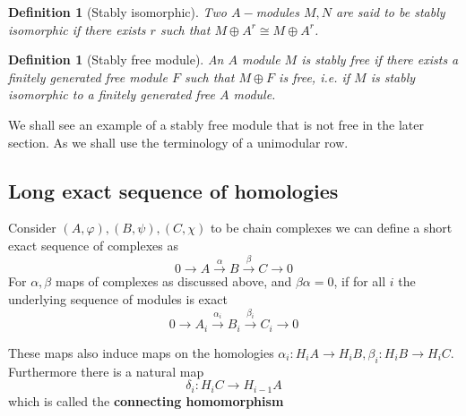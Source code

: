 \documentclass[12pt]{article}
\numberwithin{equation}{section}
\newcounter{dummy} \numberwithin{dummy}{section}
\newtheorem{definition}[dummy]{Definition}
\begin{document}
	\begin{definition}[Stably isomorphic]\label{stabiso}
		Two $A-$modules $M,N$ are said to be stably isomorphic if there exists $r$ such that $M \oplus A^r \cong M \oplus A^r$.
	\end{definition}
	\begin{definition}[Stably free module]\label{stabfree}
		An $A$ module $M$ is stably free if there exists a finitely generated free module $F$ such that $M \oplus F$ is free, i.e. if $M$ is stably isomorphic to a finitely generated free $A$ module.
	\end{definition}

	We shall see an example of a stably free module that is not free in the later section. As we shall use the terminology of a unimodular row.
	
	
	
	\subsection{Long exact sequence of homologies}
	
	Consider $(A,\varphi),(B,\psi),(C,\chi)$ to be chain complexes we can define a short exact sequence of complexes as \[ 0 \to A \xrightarrow{\alpha} B \xrightarrow{\beta} C \to 0 \]
	For $\alpha, \beta $ maps of complexes as discussed above, and $\beta \alpha=0$, if for all $i$ the underlying sequence of modules is exact\[ 0 \to A_i \xrightarrow{\alpha_i } B_i \xrightarrow{\beta_i } C_i \to 0\]
	
	These maps also induce maps on the homologies $\alpha_i: H_i A \to H_i B, \beta_i: H_i B \to H_i C$. Furthermore there is a natural map \[ 	\delta_i : H_i C \to H_{i-1}A	 \] which is called the \textbf{connecting homomorphism}
	
\end{document}
